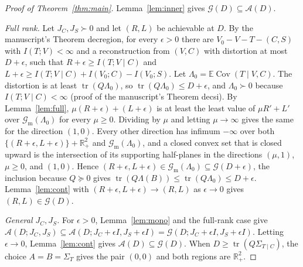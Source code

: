 \documentclass[11pt]{article}
\theoremstyle{remark}
\newcommand{\tr}{\operatorname{tr}}
\newcommand{\Cov}{\operatorname{Cov}}
\newcommand{\E}{\mathbb{E}}
\begin{document}
\begin{proof}[Proof of Theorem~\ref{thm:main}]
Lemma~\ref{lem:inner} gives $\mathcal G(D)\subseteq\mathcal A(D)$.

\emph{Full rank.} Let $J_C,J_S\succ0$ and let $(R,L)$ be achievable at $D$. By the manuscript's Theorem decregion, for every $\epsilon>0$ there are $V_0-V-T-(C,S)$ with $I(T;V)<\infty$ and a reconstruction from $(V,C)$ with distortion at most $D+\epsilon$, such that $R+\epsilon\ge I(T;V\mid C)$ and $L+\epsilon\ge I(T;V\mid C)+I(V_0;C)-I(V_0;S)$. Let $\Lambda_0=\E\Cov(T\mid V,C)$. The distortion is at least $\tr(Q\Lambda_0)$, so $\tr(Q\Lambda_0)\le D+\epsilon$, and $\Lambda_0\succ0$ because $I(T;V\mid C)<\infty$ (proof of the manuscript's Theorem decsi). By Lemma~\ref{lem:full}, $\mu(R+\epsilon)+(L+\epsilon)$ is at least the least value of $\mu R'+L'$ over $\mathcal G_{\mathrm m}(\Lambda_0)$ for every $\mu\ge0$. Dividing by $\mu$ and letting $\mu\to\infty$ gives the same for the direction $(1,0)$. Every other direction has infimum $-\infty$ over both $\{(R+\epsilon,L+\epsilon)\}+\mathbb R_+^2$ and $\mathcal G_{\mathrm m}(\Lambda_0)$, and a closed convex set that is closed upward is the intersection of its supporting half-planes in the directions $(\mu,1)$, $\mu\ge0$, and $(1,0)$. Hence $(R+\epsilon,L+\epsilon)\in\mathcal G_{\mathrm m}(\Lambda_0)\subseteq\mathcal G(D+\epsilon)$, the inclusion because $Q\succeq0$ gives $\tr(Q\Lambda(B))\le\tr(Q\Lambda_0)\le D+\epsilon$. Lemma~\ref{lem:cont} with $(R+\epsilon,L+\epsilon)\to(R,L)$ as $\epsilon\to0$ gives $(R,L)\in\mathcal G(D)$.

\emph{General $J_C,J_S$.} For $\epsilon>0$, Lemma~\ref{lem:mono} and the full-rank case give $\mathcal A(D;J_C,J_S)\subseteq\mathcal A(D;J_C+\epsilon I,J_S+\epsilon I)=\mathcal G(D;J_C+\epsilon I,J_S+\epsilon I)$. Letting $\epsilon\to0$, Lemma~\ref{lem:cont} gives $\mathcal A(D)\subseteq\mathcal G(D)$. When $D\ge\tr(Q\Sigma_{T\mid C})$, the choice $A=B=\Sigma_T$ gives the pair $(0,0)$ and both regions are $\mathbb R_+^2$.
\end{proof}
\end{document}
